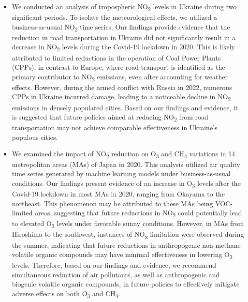 \begin{itemize}
    \item We conducted an analysis of tropospheric NO\textsubscript{2} levels in Ukraine during two significant periods. To isolate the meteorological effects, we utilized a business-as-usual NO\textsubscript{2} time series. Our findings provide evidence that the reduction in road transportation in Ukraine did not significantly result in a decrease in NO\textsubscript{2} levels during the Covid-19 lockdown in 2020. This is likely attributed to limited reductions in the operation of Coal Power Plants (CPPs), in contrast to Europe, where road transport is identified as the primary contributor to NO\textsubscript{2} emissions, even after accounting for weather effects. However, during the armed conflict with Russia in 2022, numerous CPPs in Ukraine incurred damage, leading to a noticeable decline in NO\textsubscript{2} emissions in densely populated cities. Based on our findings and evidence, it is suggested that future policies aimed at reducing NO\textsubscript{2} from road transportation may not achieve comparable effectiveness in Ukraine's populous cities.
    \item We examined the impact of NO\textsubscript{2} reduction on O\textsubscript{3} and CH\textsubscript{4} variations in 14 metropolitan areas (MAs) of Japan in 2020. This analysis utilized air quality time series generated by machine learning models under business-as-usual conditions. Our findings present evidence of an increase in O\textsubscript{3} levels after the Covid-19 lockdown in most MAs in 2020, ranging from Okayama to the northeast. This phenomenon may be attributed to these MAs being VOC-limited areas, suggesting that future reductions in NO\textsubscript{2} could potentially lead to elevated O\textsubscript{3} levels under favorable sunny conditions. However, in MAs from Hiroshima to the southwest, instances of NO\textsubscript{x} limitation were observed during the summer, indicating that future reductions in anthropogenic non-methane volatile organic compounds may have minimal effectiveness in lowering O\textsubscript{3} levels. Therefore, based on our findings and evidence, we recommend simultaneous reduction of air pollutants, as well as anthropogenic and biogenic volatile organic compounds, in future policies to effectively mitigate adverse effects on both O\textsubscript{3} and CH\textsubscript{4}.

\end{itemize}
